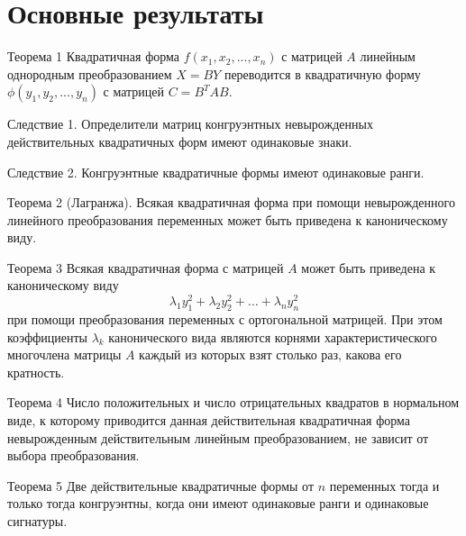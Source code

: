 \documentclass[10pt,pdf,hyperref={unicode}]{beamer}
\begin{document}
\section{Основные результаты}
\begin{frame}

\begin{block}{Теорема 1}
Квадратичная форма $f(x_1, x_2,...,x_n)$ с матрицей $A$ линейным однородным преобразованием $X = BY$ переводится в квадратичную форму $\phi(y_1, y_2,...,y_n)$ с матрицей $C=B^{T}AB$.
\end{block}

\begin{block}{Следствие 1.} 
Определители матриц конгруэнтных невырожденных действительных квадратичных форм имеют одинаковые знаки.
\end{block}

\begin{block}{Следствие 2.} 
Конгруэнтные квадратичные формы имеют одинаковые ранги.
\end{block}

\end{frame} 

\begin{frame}

\begin{block}{Теорема 2 (Лагранжа).} 
Всякая квадратичная форма при помощи невырожденного линейного преобразования переменных может быть приведена к каноническому виду. 
\end{block}


\begin{block}{Теорема 3} 
Всякая квадратичная форма с матрицей $A$ может быть приведена к каноническому виду 
$$ \lambda_1y_1^2+\lambda_2y_2^2+\dots + \lambda_ny_n^2$$
при помощи преобразования переменных с ортогональной матрицей. При этом коэффициенты $ \lambda_k $ канонического вида являются корнями характеристического многочлена матрицы $A$ каждый из которых взят столько раз, какова его кратность. 
\end{block}

\end{frame} 

\begin{frame}

\begin{block}{Теорема 4} 
Число положительных и число отрицательных квадратов в нормальном виде, к которому приводится данная действительная квадратичная форма невырожденным действительным линейным преобразованием, не зависит от выбора преобразования.
\end{block}

\begin{block}{Теорема 5} 
Две действительные квадратичные формы от $n$ переменных тогда и только тогда конгруэнтны, когда они имеют одинаковые ранги и одинаковые сигнатуры.
\end{block}

\end{frame} 
\end{document}
